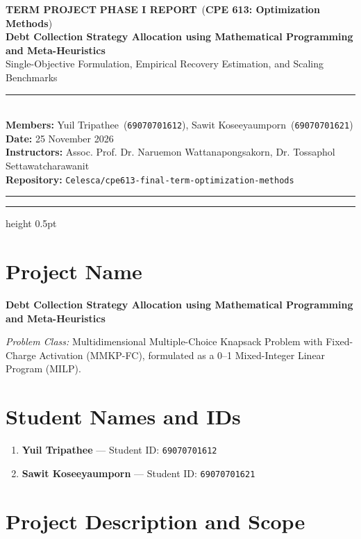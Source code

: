 \documentclass[10pt,a4paper]{article}
\newcommand{\CourseCode}{CPE 613}
\newcommand{\CourseName}{Optimization Methods}
\newcommand{\AssignmentNumberText}{TERM PROJECT}
\newcommand{\AssignmentNumberVal}{PHASE I REPORT}
\newcommand{\AssignmentTitle}{Debt Collection Strategy Allocation using Mathematical Programming and Meta-Heuristics}
\newcommand{\SubTitle}{Single-Objective Formulation, Empirical Recovery Estimation, and Scaling Benchmarks}
\newcommand{\AssignmentDate}{25 November 2026}
\newcommand{\StudentOneName}{Yuil Tripathee}
\newcommand{\StudentOneID}{69070701612}
\newcommand{\StudentTwoName}{Sawit Koseeyaumporn}
\newcommand{\StudentTwoID}{69070701621}
\newcommand{\InstructorNames}{Assoc. Prof. Dr. Naruemon Wattanapongsakorn, Dr. Tossaphol Settawatcharawanit}
\newcommand{\makeproposalheader}{
  \thispagestyle{plain}
  \begingroup
  \raggedright
  {\normalsize\sffamily\color{gray!70!black}\textbf{\AssignmentNumberText} {\color{docaccent}\textbf{\AssignmentNumberVal}}~(\textbf{\CourseCode: \CourseName})}\\[2pt]
  {\LARGE\sffamily\bfseries\color{docaccent}\AssignmentTitle}\\[2pt]
  {\normalsize\sffamily\color{gray!80!black}\SubTitle}\\[5pt]
  {\color{docaccent}\rule{\textwidth}{1.0pt}}\\[3pt]
  {\small\sffamily
  \textbf{Members:} \StudentOneName~(\texttt{\StudentOneID}), \StudentTwoName~(\texttt{\StudentTwoID}) \hfill \textbf{Date:} \AssignmentDate \\
  \textbf{Instructors:} \InstructorNames \\
  \textbf{Repository:} \texttt{Celesca/cpe613-final-term-optimization-methods}}\\[2pt]
  {\color{docaccent}\rule{\textwidth}{0.4pt}}
  \endgroup
  \vspace{0.2em}
}
\begin{document}
\makeproposalheader

\setcounter{tocdepth}{2}
\begingroup
\small
\setlength{\parskip}{0.4pt}
\tableofcontents
\endgroup
\vspace{0.5em}
{\color{docaccent!40}\hrule height 0.5pt}
\vspace{0.5em}

\section{Project Name}
\textbf{Debt Collection Strategy Allocation using Mathematical Programming and Meta-Heuristics}

\emph{Problem Class:} Multidimensional Multiple-Choice Knapsack Problem with Fixed-Charge Activation (MMKP-FC), formulated as a 0--1 Mixed-Integer Linear Program (MILP).

\section{Student Names and IDs}
\begin{enumerate}
    \item \textbf{\StudentOneName} --- Student ID: \texttt{\StudentOneID}
    \item \textbf{\StudentTwoName} --- Student ID: \texttt{\StudentTwoID}
\end{enumerate}

\section{Project Description and Scope}
\end{document}
